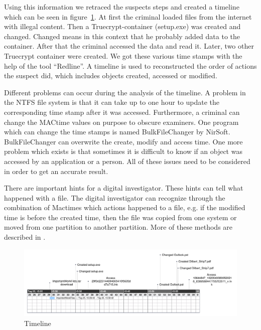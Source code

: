 Using this information we retraced the suspects steps and created a timeline which can be seen in figure~\ref{fig:timeline}.
At first the criminal loaded files from the internet with illegal content. 
Then a Truecrypt-container (setup.exe) was created and changed. 
Changed means in this context that he probably added data to the container.
After that the criminal accessed the data and read it. 
Later, two other Truecrypt container were created. 
We got these various time stamps with the help of the tool “Redline”. 
A timeline is used to reconstructed the order of actions the suspect did, which includes objects created, accessed or modified.

Different problems can occur during the analysis of the timeline.
A problem in the NTFS file system is that it can take up to one hour to update the corresponding time stamp after it was accessed. 
Furthermore, a criminal can change the MACtime values on purpose to obscure examiners. 
One program which can change the time stamps is named BulkFileChanger by NirSoft.
BulkFileChanger can overwrite the create, modify and access time. 
One more problem which exists is that sometimes it is difficult to know if an object was accessed by an application or a person. 
All of these issues need to be considered in order to get an accurate result. 

There are important hints for a digital investigator. 
These hints can tell what happened with a file. 
The digital investigator can recognize through the combination of Mactimes which actions happened to a file, e.g. if the modified time is before the created time, then the file was copied from one system or moved from one partition to another partition. 
More of these methods are described in .

\begin{figure}[tbph]
	\centering
		\includegraphics[width=\textwidth]{graphics/Timeline.pdf} 	
	\caption{Timeline}
	\label{fig:timeline}
\end{figure}
